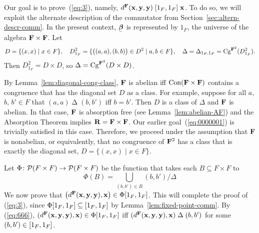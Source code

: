 Our goal is to prove~(\ref{eq:3}), namely,
  $d^{\bF}(\bx, \by, \by) \comr{1_F} \bx$. To do so, we will exploit the
alternate description of the commutator from
Section~\ref{sec:altern-descr-comm}.
In the present context, $\bbeta$ is represented by 
$1_F$, the universe of the algebra $\mathbf{F}\times \mathbf{F}$.
Let %
\[
D = \{(x,x) \mid x\in F\}, \quad
D^2_{1_F} = \{\bigl((a,a), (b,b)\bigr) \in D^2 \mid a, b \in F\}, \quad
\Delta = \Delta_{1_F, 1_F} = \Cg^{\bF^2}(D_{1_F}^2). %
\]
Then $D^2_{1_F} = D\times D$, so $\Delta = \operatorname{Cg}^{\mathbf{F}^2}(D\times D)$.

By Lemma~\ref{lem:diagonal-cong-class},
$\mathbf{F}$ is abelian iff $\operatorname{Con}(\mathbf{F}\times \mathbf{F})$
contains a congruence
that has the diagonal set $D$ as a class.
For example, suppose for all $a$, $b$, $b'\in F$ that 
$(a,a)\mathrel{\Delta} (b,b')$ iff $b = b'$.
Then $D$ is a class of $\Delta$ and $\mathbf{F}$ is abelian.
In that case, $\mathbf{F}$ is absorption free
(see Lemma~\ref{lem:abelian-AF}) and the Absorption Theorem implies
$\mathbf{R}  = \mathbf{F} \times \mathbf{F}$.
Our earlier goal~(\ref{eq:0000001}) is
trivially satisfied in this case. Therefore, we proceed under the assumption that $\mathbf{F}$ is
nonabelian, or equivalently, that no congruence of $\mathbf{F}^2$ has a class that is
exactly the diagonal set, $D = \{(x,x) \mid x\in F\}$.

Let $\Phi \colon \mathcal{P}(F \times F) \to \mathcal{P}(F\times F)$ be the function that
takes each $B \subseteq F\times F$ to
\begin{equation}
  \label{eq:666}
  \Phi(B) = \bigcup_{(b,b')\in B} (b,b')/\Delta
\end{equation}
We now prove that
$\bigl(d^{\bF}(\bx, \by, \by), \bx \bigr) \in  \Phi \com{1_F}$.
This will complete the proof of (\ref{eq:3}), since
$\Phi [1_F, 1_F] \subseteq [1_F, 1_F]$ by
Lemma~\ref{lem:fixed-point-comm}.
By (\ref{eq:666}), 
$(d^{\bF}(\bx, \by, \by), \bx ) \in  \Phi \com{1_F}$ iff
$(d^{\bF}(\bx, \by, \by), \bx ) \mathrel{\Delta} (b, b')$
for some $(b, b') \in [1_F, 1_F]$.
\renewcommand\bx{\ensuremath{\mathbf{x}}}
\renewcommand\by{\ensuremath{\mathbf{y}}}


